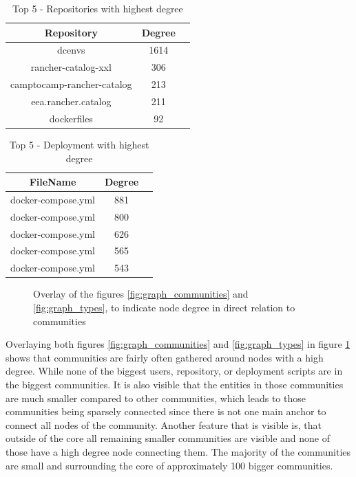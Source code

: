 \begin{table}[h!]
    \centering
    \begin{tabular}{ |c|c|c| }
    \hline
    Repository & Degree \\
    \hline
         dcenvs & 1614\\
         rancher-catalog-xxl & 306\\
         camptocamp-rancher-catalog & 213\\
         eea.rancher.catalog & 211\\
         dockerfiles & 92\\
    \hline
    \end{tabular}
    \caption{Top 5 - Repositories with highest degree}
    \label{table_top_repositories}
\end{table}

\begin{table}[h!]
    \centering
    \begin{tabular}{ |c|c|c| }
    \hline
    FileName & Degree \\
    \hline
         docker-compose.yml & 881\\
         docker-compose.yml & 800\\
         docker-compose.yml & 626\\
         docker-compose.yml & 565\\
         docker-compose.yml & 543\\
    \hline
    \end{tabular}
    \caption{Top 5 - Deployment with highest degree}
    \label{table_top_deployments}
\end{table}


\begin{figure}[H]\centering
{}
    \caption{Overlay of the figures \ref{fig:graph_communities} and \ref{fig:graph_types}, to indicate node degree in direct relation to communities}
    \label{fig:graph_merged}
\end{figure}

Overlaying both figures \ref{fig:graph_communities} and \ref{fig:graph_types} in figure \ref{fig:graph_merged} shows that communities are fairly often gathered around nodes with a high degree. While none of the biggest users, repository, or deployment scripts are in the biggest communities. It is also visible that the entities in those communities are much smaller compared to other communities, which leads to those communities being sparsely connected since there is not one main anchor to connect all nodes of the community. Another feature that is visible is, that outside of the core all remaining smaller communities are visible and none of those have a high degree node connecting them. The majority of the communities are small and surrounding the core of approximately 100 bigger communities.

